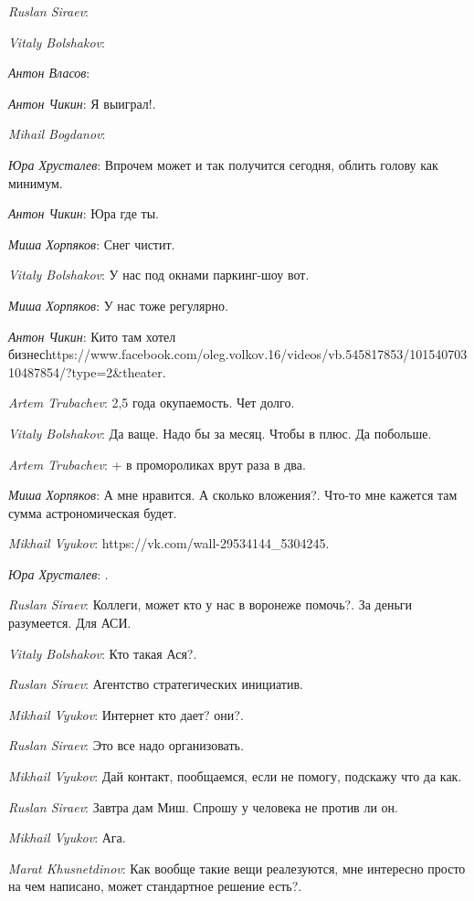 \documentclass[10pt]{book}
\newcommand{\AUTHOR}[1]{\emph{#1}:}
\begin{document}
\AUTHOR{Ruslan Siraev}

\AUTHOR{Vitaly Bolshakov}

\AUTHOR{Антон Власов}

\AUTHOR{Антон Чикин}  Я выиграл!.

\AUTHOR{Mihail Bogdanov}

\AUTHOR{Юра Хрусталев} Впрочем может и так получится сегодня, облить голову как минимум.

\AUTHOR{Антон Чикин} Юра где ты.

\AUTHOR{Миша Хорпяков} Снег чистит.

\AUTHOR{Vitaly Bolshakov} У нас под окнами паркинг-шоу вот.

\AUTHOR{Миша Хорпяков} У нас тоже регулярно.

\AUTHOR{Антон Чикин} Кито там хотел бизнесhttps://www.facebook.com/oleg.volkov.16/videos/vb.545817853/10154070310487854/?type=2&theater.

\AUTHOR{Artem Trubachev} 2,5 года окупаемость. Чет долго.

\AUTHOR{Vitaly Bolshakov} Да ваще. Надо бы за месяц. Чтобы в плюс. Да побольше.

\AUTHOR{Artem Trubachev} + в промороликах врут раза в два.

\AUTHOR{Миша Хорпяков} А мне нравится. А сколько вложения?. Что-то мне кажется там сумма астрономическая будет.

\AUTHOR{Mikhail Vyukov} https://vk.com/wall-29534144_5304245.

\AUTHOR{Юра Хрусталев} \0.

\AUTHOR{Ruslan Siraev} Коллеги, может кто у нас в воронеже помочь?.  За деньги разумеется. Для АСИ.

\AUTHOR{Vitaly Bolshakov} Кто такая Ася?.

\AUTHOR{Ruslan Siraev} Агентство стратегических инициатив.

\AUTHOR{Mikhail Vyukov} Интернет кто дает? они?.

\AUTHOR{Ruslan Siraev} Это все надо организовать.

\AUTHOR{Mikhail Vyukov} Дай контакт, пообщаемся, если не помогу, подскажу что да как.

\AUTHOR{Ruslan Siraev} Завтра дам Миш. Спрошу у человека не против ли он.

\AUTHOR{Mikhail Vyukov} Ага.

\AUTHOR{Marat Khusnetdinov} Как вообще такие вещи реалезуются, мне интересно просто на чем написано, может стандартное решение есть?.
\end{document}
